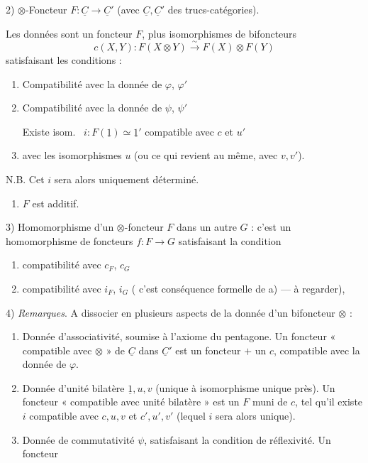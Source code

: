 \documentclass[11pt,a4paper]{article}
\begin{document}
2) $\otimes$-Foncteur $F : \underline{C} \to \underline{C}'$ (avec
$\underline{C}, \underline{C}'$ des trucs-catégories).

Les données sont un foncteur \struck{\ill{}} $F$, plus 
isomorphismes de bifoncteurs
\[
c(X,Y) : F(X \otimes Y) \overset{\sim}{\longrightarrow} F(X) \otimes F(Y)
\]
\struck{\ill{}} satisfaisant les conditions :
\begin{enumerate}
\item[a)] Compatibilité  avec la donnée de $\varphi$, $\varphi'$
\item[b)] Compatibilité  avec la donnée de $\psi$, $\psi'$

Existe isom.\  $i : F(\underline{1}) \simeq \underline{1}'$
compatible avec $c$ et $u'$
\item[c)]  avec les isomorphismes
$u$ (ou ce qui revient au même, avec  $v, v'$).
\end{enumerate}

N.B. Cet $i$ sera alors uniquement déterminé.

\begin{enumerate}
\item[d)] $F$ est additif.
\end{enumerate}

3) Homomorphisme d'un $\otimes$-foncteur $F$ dans un autre $G$ : c'est un
homomorphisme de foncteurs $f : F \to G$ satisfaisant la condition
\begin{enumerate}
\item[a)] compatibilité avec \struck{\ill{}} $c_{F}$, $c_{G}$
  \marginal{\struck{\ill{}}} 
\item[b)]  compatibilité avec $i_{F}$, $i_{G}$
  ( c'est  conséquence formelle de a) --- à
  regarder), 
\end{enumerate}

4) \emph{Remarques}. A dissocier  en plusieurs aspects de
la donnée d'un bifoncteur $\otimes$ :
\begin{enumerate}
\item[a)] Donnée d'associativité, soumise à l'axiome du pentagone. Un foncteur
« compatible avec $\otimes$  » de $\underline{C}$ dans
$\underline{C}'$ est un foncteur $+$ un $c$, compatible avec la donnée de
$\varphi$.
\item[b)] Donnée d'unité bilatère $\underline{1}, u, v$ (unique à isomorphisme
unique près). Un foncteur « compatible avec  unité bilatère »
est un $F$ muni de $c$, tel qu'il existe $i$ compatible avec $c, u, v$ et
$c', u', v'$ (lequel $i$ sera alors unique).
\item[c)] Donnée de commutativité $\psi$, satisfaisant la condition de
réflexivité. Un foncteur
\end{enumerate}
\end{document}
